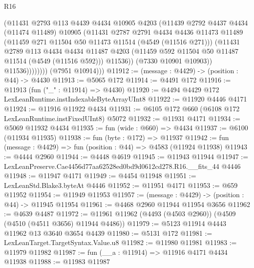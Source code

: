 \begin{lexlean}{R16}
\begin{coremodule}
                      (@11431
                        @2793
                        @113
                        @4439
                        @4434
                        @10905
                        @4203
                        (@11439
                          @2792
                          @4437
                          @4434
                          (@11474 @11489)
                          @10905
                          (@11431
                            @2787
                            @2791
                            @4434
                            @4436
                            @11473
                            @11489
                            (@11459 @271 @11504 @50 @11473 @11514 (@4549 (@11516 @271)))
                            (@11431
                              @2789
                              @113
                              @4434
                              @4434
                              @11487
                              @4203
                              (@11459 @592 @11504 @50 @11487 @11514 (@4549 (@11516 @592)))
                              @11536))
                          (@7330 @10901 @10903))
                        @11536))))))))
        (@7951 @10914)))
@11912 := (message : @4429) -> (position : @44) -> @4430
@11913 := @5065 @172
@11914 := @4491 @172
@11916 := @11913 (fun ("_" : @11914) => @4430)
@11920 := @4494 @4429 @172 LexLeanRuntime.instIndexableByteArrayUInt8
@11922 := @11920 @4446 @4171
@11924 := @11916 @11922 @4434
@11931 := @6105 @172 @660 (@6108 @172 LexLeanRuntime.instFixedUInt8) @5072
@11932 := @11931 @4171
@11934 := @5069 @11932 @4434
@11935 := fun (wide : @660) => @4434
@11937 := @6100 (@11934 @11935)
@11938 := fun (byte : @172) => @11937
@11942 := fun (message : @4429) => fun (position : @44) => @4583 (@11924 @11938)
@11943 := @4444 @2960
@11944 := @4448 @4619
@11945 := @11943 @11944
@11947 := LexLeanPreserve.Cae4456d77aa62528ed0bd9d0612cd278.R16.__fits_44 @4446
@11948 := @11947 @4171
@11949 := @4454 @11948
@11951 := LexLeanStd.Blake3.byteAt @4446
@11952 := @11951 @4171
@11953 := @659 @11952
@11954 := @11949 @11953
@11957 := (message : @4429) -> (position : @44) -> @11945 @11954
@11961 := @4468 @2960 @11944 @11954 @3656
@11962 := @4639 @4487
@11972 := @11961 @11962 (@4493 (@4503 @2960)) (@4509 (@4510 (@4511 @3656) @11944 @4486))
@11979 := @5123 @11914 @4443 @11962 @13 @3640 @3654 @4439
@11980 := @5131 @172
@11981 := LexLeanTarget.TargetSyntax.Value.u8
@11982 := @11980 @11981
@11983 := @11979 @11982
@11987 := fun (__a : @11914) => @11916 @4171 @4434 @11938
@11988 := @11983 @11987

\end{coremodule}
\end{lexlean}
